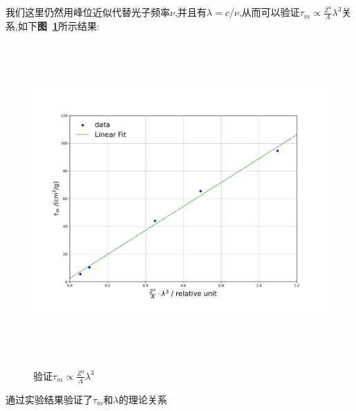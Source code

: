\documentclass[a4paper]{article}
\begin{document}
我们这里仍然用峰位近似代替光子频率$\nu$,并且有$\lambda=c/\nu$,从而可以验证$\tau_m\propto\frac{Z^4}{A}\lambda^3$关系,如下\textbf{图~\ref{fig:fig7}}所示结果:
\begin{figure}[H]
 \centering
 \caption{验证$\tau_m\propto\frac{Z^4}{A}\lambda^3$}
 \includegraphics[height=12cm, width=16cm]{images/phyex2_fig6.pdf}
 \label{fig:fig7}
\end{figure}
通过实验结果验证了$\tau_m$和$\lambda$的理论关系
\newpage
\end{document}
